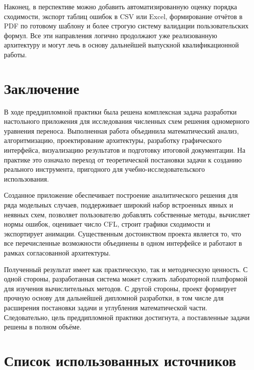 \documentclass[a4paper,14pt]{extreport}
\begin{document}
Наконец, в перспективе можно добавить автоматизированную оценку порядка сходимости, экспорт таблиц ошибок в CSV или Excel, формирование отчётов в PDF по готовому шаблону и более строгую систему валидации пользовательских формул. Все эти направления логично продолжают уже реализованную архитектуру и могут лечь в основу дальнейшей выпускной квалификационной работы.

\chapter*{Заключение}

В ходе преддипломной практики была решена комплексная задача разработки настольного приложения для исследования численных схем решения одномерного уравнения переноса. Выполненная работа объединила математический анализ, алгоритмизацию, проектирование архитектуры, разработку графического интерфейса, визуализацию результатов и подготовку итоговой документации. На практике это означало переход от теоретической постановки задачи к созданию реального инструмента, пригодного для учебно-исследовательского использования.

Созданное приложение обеспечивает построение аналитического решения для ряда модельных случаев, поддерживает широкий набор встроенных явных и неявных схем, позволяет пользователю добавлять собственные методы, вычисляет нормы ошибок, оценивает число CFL, строит графики сходимости и экспортирует анимации. Существенным достоинством проекта является то, что все перечисленные возможности объединены в одном интерфейсе и работают в рамках согласованной архитектуры.

Полученный результат имеет как практическую, так и методическую ценность. С одной стороны, разработанная система может служить лабораторной платформой для изучения вычислительных методов. С другой стороны, проект формирует прочную основу для дальнейшей дипломной разработки, в том числе для расширения постановки задачи и углубления математической части. Следовательно, цель преддипломной практики достигнута, а поставленные задачи решены в полном объёме.

\chapter*{Список использованных источников}
\end{document}
